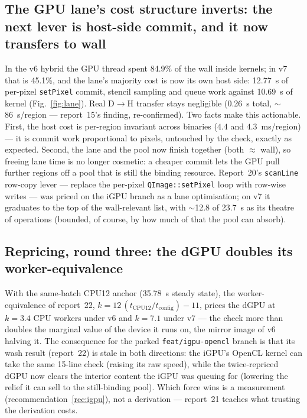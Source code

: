 \documentclass[
	english,
	letterpaper, oneside
]{article}
\begin{document}
\subsection{The GPU lane's cost structure inverts: the next lever is host-side
commit, and it now transfers to wall}

In the v6 hybrid the GPU thread spent 84.9\% of the wall inside kernels;
in v7 that is 45.1\%, and the lane's majority cost is now its own host
side: 12.77~s of per-pixel \texttt{setPixel} commit, stencil sampling and
queue work against 10.69~s of kernel (Fig.~\ref{fig:lane}). Real D$\to$H
transfer stays negligible (0.26~s total, $\sim$86~\textmu s/region ---
report~15's finding, re-confirmed). Two facts make this actionable. First,
the host cost is per-region invariant across binaries ($4.4$ and
$4.3$~ms/region) --- it is commit work proportional to pixels, untouched by
the check, exactly as expected. Second, the lane and the pool now finish
together (both $\approx$ wall), so freeing lane time is no longer cosmetic:
a cheaper commit lets the GPU pull further regions off a pool that is still
the binding resource. Report~20's \texttt{scanLine} row-copy lever --- replace
the per-pixel \texttt{QImage::setPixel} loop with row-wise writes --- was
priced on the iGPU branch as a lane optimisation; on v7 it graduates to the
top of the wall-relevant list, with $\sim$12.8 of 23.7~s as its theatre of
operations (bounded, of course, by how much of that the pool can absorb).

\subsection{Repricing, round three: the dGPU doubles its worker-equivalence}
\label{sec:repricing}

With the same-batch CPU12 anchor (35.78~s steady state), the
worker-equivalence of report~22, $k = 12\,(t_{\mathrm{CPU12}}/t_{\mathrm{config}}) - 11$,
prices the dGPU at $k = 3.4$ CPU workers under v6 and $k = 7.1$
under v7 --- the check more than doubles the marginal value of the device
it runs on, the mirror image of v6 halving it. The consequence for the
parked \texttt{feat/igpu-opencl} branch is that its wash result (report~22)
is stale in both directions: the iGPU's OpenCL kernel can take the
same 15-line check (raising its raw speed), while the twice-repriced dGPU
now clears the interior content the iGPU was queuing for (lowering the
relief it can sell to the still-binding pool). Which force wins is a
measurement (recommendation~\ref{rec:igpu}), not a derivation --- report~21
teaches what trusting the derivation costs.
\end{document}
